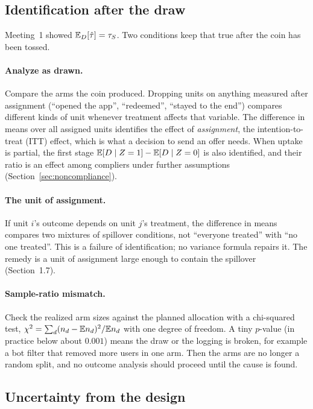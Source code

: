 \documentclass[11pt]{article}
\begin{document}
\subsection{Identification after the draw}

Meeting~1 showed $\mathbb{E}_D[\hat{\tau}] = \tau_S$. Two conditions keep that true after the coin has been tossed.

\paragraph{Analyze as drawn.} Compare the arms the coin produced. Dropping units on anything measured
after assignment (``opened the app'', ``redeemed'', ``stayed to the end'') compares different kinds of unit
whenever treatment affects that variable. The difference in means over all assigned units identifies the
effect of \emph{assignment}, the intention-to-treat (ITT) effect, which is what a decision to send an offer
needs. When uptake is partial, the first stage $\mathbb{E}[D \mid Z=1] - \mathbb{E}[D \mid Z=0]$ is also identified, and
their ratio is an effect among compliers under further assumptions (Section~\ref{sec:noncompliance}).

\paragraph{The unit of assignment.} If unit $i$'s outcome depends on unit $j$'s treatment, the difference
in means compares two mixtures of spillover conditions, not ``everyone treated'' with ``no one treated''.
This is a failure of identification; no variance formula repairs it. The remedy is a unit of assignment
large enough to contain the spillover (Section~1.7).

\paragraph{Sample-ratio mismatch.} Check the realized arm sizes against the planned allocation with a
chi-squared test, $\chi^2 = \sum_d (n_d - \mathbb{E} n_d)^2/\mathbb{E} n_d$ with one degree of freedom. A tiny $p$-value (in
practice below about $0.001$) means the draw or the logging is broken, for example a bot filter that removed
more users in one arm. Then the arms are no longer a random split, and no outcome analysis should proceed
until the cause is found.

\subsection{Uncertainty from the design}
\end{document}
